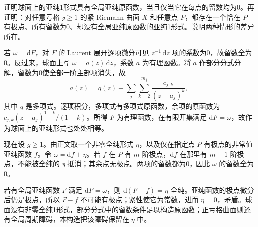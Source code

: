 \begin{exercise}\label{b3:ex:A-7}
证明球面上的亚纯1形式具有全局亚纯原函数，当且仅当它在每点的留数均为0。再证明：对任意亏格 \(g\ge1\) 的紧 Riemann 曲面 \(X\) 和任意点 \(P\)，都存在一个恰在 \(P\) 有极点、所有留数为0、却没有全局亚纯原函数的亚纯1形式。说明两种情形的差异所在。
\end{exercise}
\begin{solution}
若 \(\omega=\mathrm{d}F\)，对 \(F\) 的 Laurent 展开逐项微分可见 \(z^{-1}\,\mathrm{d}z\) 项的系数为0，故留数全为0。反过来，球面上写 \(\omega=a(z)\,\mathrm{d}z\)，系数 \(a\) 为有理函数。将 \(a\) 作部分分式分解，留数为0使全部一阶主部项消失，故
\[
 a(z)=q(z)+\sum_{j}\sum_{k=2}^{m_j}\frac{c_{j,k}}{(z-a_j)^k},
\]
其中 \(q\) 是多项式。逐项积分，多项式有多项式原函数，余项的原函数为 \(c_{j,k}(z-a_j)^{1-k}/(1-k)\)。所得 \(F\) 为有理函数，在有限开集满足 \(\mathrm{d}F=\omega\)，故作为球面上的亚纯形式也处处相等。

现在设 \(g\ge1\)。由正文取一个非零全纯形式 \(\eta\)，以及仅在指定点 \(P\) 有极点的非常值亚纯函数 \(f\)。令 \(\omega=\mathrm{d}f+\eta\)。若 \(f\) 在 \(P\) 有 \(m\) 阶极点，\(\mathrm{d}f\) 在那里有 \(m+1\) 阶极点，不能被全纯的 \(\eta\) 抵消；其余点无极点。两项的留数都为0，因此 \(\omega\) 的留数全为0。

若有全局亚纯函数 \(F\) 满足 \(\mathrm{d}F=\omega\)，则 \(\mathrm{d}(F-f)=\eta\) 全纯。亚纯函数的极点微分后仍是极点，所以 \(F-f\) 不可能有极点；紧性使它为常数，进而 \(\eta=0\)，矛盾。球面没有非零全纯1形式，部分分式中的留数条件足以构造原函数；正亏格曲面则还有全局周期障碍，本构造把该障碍保留在 \(\eta\) 中。
\end{solution}

